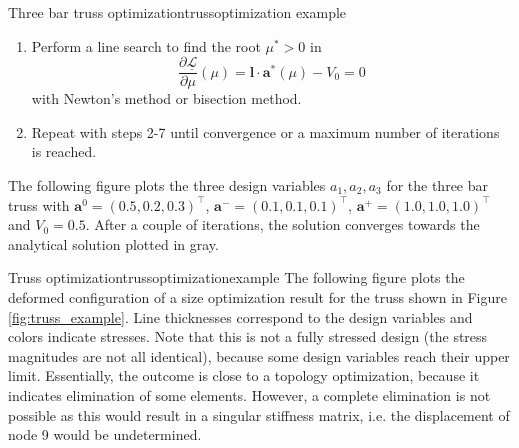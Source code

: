 \begin{example}{Three bar truss optimization}{trussoptimization example}
\begin{enumerate}
\begin{align}
{{                (L^k_j-a^k_j)^2}{\mu l_j}} \\
                \mathbf{a}^* (\mu) &= \textrm{clamp}\left(\hat{\mathbf{a}}(\mu), \tilde{\mathbf{a}}^{-,k}, \mathbf{a}^+ \right)
            \end{align}
            to define the dual function 
            \begin{equation}
                \underline{\mathcal{L}}(\mu) = \mathcal{L}(\mathbf{a}^* (\mu), \mu)
            \end{equation}
        \item Perform a line search to find the root $\mu^*>0$ in 
        \begin{equation}
            \frac{\partial \underline{\mathcal{L}}}{\partial \mu}(\mu) = \mathbf{l} \cdot \mathbf{a}^* (\mu) - V_0 = 0
        \end{equation}
        with Newton's method or bisection method. 
        \item Repeat with steps 2-7 until convergence or a maximum number of iterations is reached.
    \end{enumerate}

    The following figure plots the three design variables $a_1, a_2, a_3$ for the three bar truss with $\mathbf{a}^0=(0.5,0.2,0.3)^\top$, $\mathbf{a}^-=(0.1,0.1,0.1)^\top$, $\mathbf{a}^+=(1.0,1.0,1.0)^\top$ and $V_0=0.5$. After a couple of iterations, the solution converges towards the analytical solution plotted in gray.

    \begin{minipage}{.5\textwidth}
        \centering
        
    \end{minipage}%
    \begin{minipage}{.5\textwidth}
        \centering
        
    \end{minipage}
       
\end{example}

\begin{example}{Truss optimization}{trussoptimizationexample}
    The following figure plots the deformed configuration of a size optimization result for the truss shown in Figure \ref{fig:truss_example}. Line thicknesses correspond to the design variables and colors indicate stresses. Note that this is not a fully stressed design (the stress magnitudes are not all identical), because some design variables reach their upper limit. Essentially, the outcome is close to a topology optimization, because it indicates elimination of some elements. However, a complete elimination is not possible as this would result in a singular stiffness matrix, i.e. the displacement of node 9 would be undetermined. 

    \begin{center}
         
    \end{center}
\end{example}

